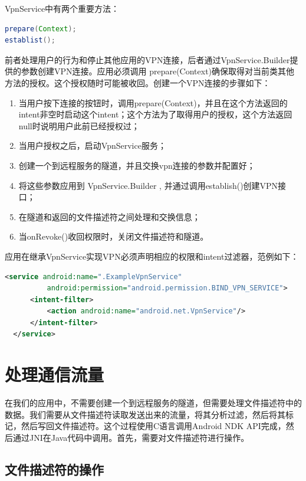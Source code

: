 \documentclass[format=final, language=chinese, degree=bachelor]{hustthesis}
\begin{document}
VpnService中有两个重要方法：

\begin{lstlisting}[language=Java]
prepare(Context);
establist();
\end{lstlisting}

前者处理用户的行为和停止其他应用的VPN连接，后者通过VpnService.Builder提供的参数创建VPN连接。应用必须调用 prepare(Context)确保取得对当前类其他方法的授权。这个授权随时可能被收回。创建一个VPN连接的步骤如下：
 \begin{enumerate}
     \item 当用户按下连接的按钮时，调用prepare(Context)，并且在这个方法返回的intent非空时启动这个intent；这个方法为了取得用户的授权，这个方法返回null时说明用户此前已经授权过；
     \item 当用户授权之后，启动VpnService服务；
     \item 创建一个到远程服务的隧道，并且交换vpn连接的参数并配置好；
     \item 将这些参数应用到 VpnService.Builder , 并通过调用establish()创建VPN接口；
     \item 在隧道和返回的文件描述符之间处理和交换信息；
     \item 当onRevoke()收回权限时，关闭文件描述符和隧道。
\end{enumerate}

 应用在继承VpnService实现VPN必须声明相应的权限和intent过滤器，范例如下：
\begin{lstlisting}[language=xml]
  <service android:name=".ExampleVpnService"
          android:permission="android.permission.BIND_VPN_SERVICE">
      <intent-filter>
          <action android:name="android.net.VpnService"/>
      </intent-filter>
  </service>
\end{lstlisting}


\section{处理通信流量}

在我们的应用中，不需要创建一个到远程服务的隧道，但需要处理文件描述符中的数据。我们需要从文件描述符读取发送出来的流量，将其分析过滤，然后将其标记，然后写回文件描述符。这个过程使用C语言调用Android NDK API完成，然后通过JNI在Java代码中调用。首先，需要对文件描述符进行操作。

\subsection{文件描述符的操作}
\end{document}
